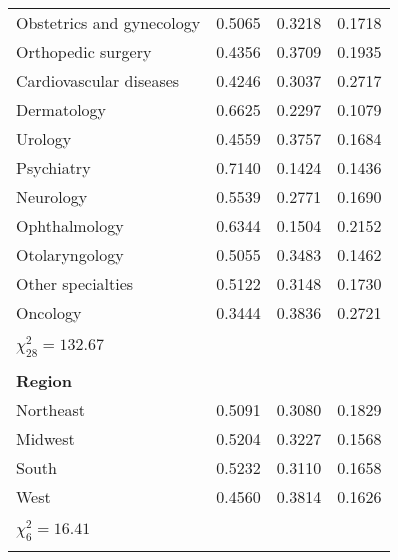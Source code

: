 \documentclass[12pt]{report}
\begin{document}
{\begin{center}
\begin{longtable}{lccc}
Obstetrics and gynecology              & 0.5065   & 0.3218     & 0.1718     \\
Orthopedic surgery                     & 0.4356   & 0.3709     & 0.1935     \\
Cardiovascular diseases                & 0.4246   & 0.3037     & 0.2717     \\
Dermatology                            & 0.6625   & 0.2297     & 0.1079     \\
Urology                                & 0.4559   & 0.3757     & 0.1684     \\
Psychiatry                             & 0.7140   & 0.1424     & 0.1436     \\
Neurology                              & 0.5539   & 0.2771     & 0.1690     \\
Ophthalmology                          & 0.6344   & 0.1504     & 0.2152     \\
Otolaryngology                         & 0.5055   & 0.3483     & 0.1462     \\
Other specialties                      & 0.5122   & 0.3148     & 0.1730     \\
Oncology                               & 0.3444   & 0.3836     & 0.2721     \\
                                       &          &            &            \\
$\chi^2_{28} = 132.67$                 &          &            &            \\
                                       &          &            &            \\
\textbf{Region}                        &          &            &            \\
Northeast                              & 0.5091   & 0.3080     & 0.1829     \\
Midwest                                & 0.5204   & 0.3227     & 0.1568     \\
South                                  & 0.5232   & 0.3110     & 0.1658     \\
West                                   & 0.4560   & 0.3814     & 0.1626     \\
                                       &          &            &            \\
$\chi^2_6 = 16.41$                     &          &            &            \\
                                       &          &            &            \\

\end{longtable}
\end{center}}
\end{document}
